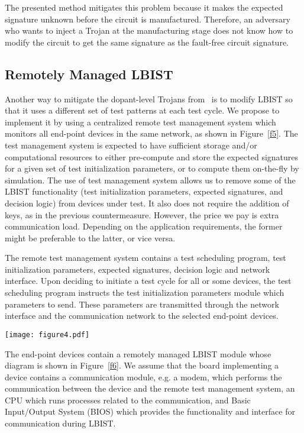 \documentclass[a4paper]{llncs}
\begin{document}
The presented method mitigates this problem because it makes the expected signature unknown before the circuit is manufactured. Therefore, an adversary who wants to inject a Trojan at the manufacturing stage does not know how to modify the circuit to get the same signature as the fault-free circuit signature.

\subsection{Remotely Managed LBIST} 

Another way to mitigate the dopant-level Trojans from~\cite{BeRPB13} is to modify 
LBIST so that it uses a different set of test patterns at each test cycle. 
We propose to implement it by using a centralized
remote test management system which monitors all end-point devices in the same network, as shown in Figure~\ref{f5}. The test management system is expected to have sufficient storage and/or computational resources to either pre-compute and store the expected signatures for a given set of test initialization parameters, or to compute them on-the-fly by simulation. The use of test management system allows us to remove some of the LBIST functionality (test initialization parameters, expected signatures, and decision logic) from devices under test. It also does not require the addition of keys, as in the previous countermeasure. However, the price we pay is extra communication load. Depending on the application requirements, the former might be preferable to the latter, or vice versa.

The remote test management system contains a test scheduling program, test initialization parameters, expected signatures, decision logic and network interface. Upon deciding to initiate a test cycle for all or some devices, the test scheduling program 
instructs the test initialization parameters module which parameters to send. These parameters are transmitted through the network interface and the communication network to the selected end-point devices. 



\begin{figure*}[t!]
\begin{center}
\texttt{[image: figure4.pdf]}
\caption{Remote test management}\label{f5} 
\end{center}
\end{figure*}

The end-point devices contain a remotely managed LBIST module whose diagram is shown in Figure~\ref{f6}. We assume that the board implementing a device contains a communication module, e.g. a modem, which performs the communication between the device and the remote test management system, an CPU which runs processes related to the communication, and Basic Input/Output System (BIOS) which provides the functionality and interface for communication during LBIST.
\end{document}
